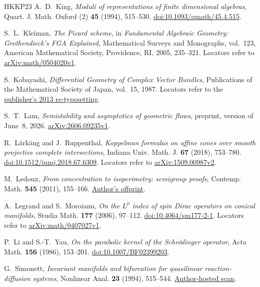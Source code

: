 \begin{thebibliography}{HKKP23}
A.~D.~King, \emph{Moduli of representations of finite dimensional algebras},
Quart. J. Math. Oxford (2) \textbf{45} (1994), 515--530.
\href{https://doi.org/10.1093/qmath/45.4.515}{doi:10.1093/qmath/45.4.515}.

S.~L.~Kleiman, \emph{The Picard scheme}, in
\emph{Fundamental Algebraic Geometry: Grothendieck's FGA Explained},
Mathematical Surveys and Monographs, vol.~123,
American Mathematical Society, Providence, RI, 2005, 235--321.
Locators refer to \href{https://arxiv.org/abs/math/0504020v1}{arXiv:math/0504020v1}.

S.~Kobayashi, \emph{Differential Geometry of Complex Vector Bundles},
Publications of the Mathematical Society of Japan, vol.~15, 1987.
Locators refer to the
\href{https://www.mathsoc.jp/assets/pdf/publications/pubmsj/Vol15.pdf}
{publisher's 2013 re-typesetting}.

S.~T.~Lam, \emph{Semistability and asymptotics of geometric flows},
preprint, version of June~8, 2026.
\href{https://arxiv.org/abs/2606.09235v1}{arXiv:2606.09235v1}.

R.~Lärkäng and J.~Ruppenthal,
\emph{Koppelman formulas on affine cones over smooth projective
complete intersections}, Indiana Univ. Math. J. \textbf{67} (2018), 753--780.
\href{https://doi.org/10.1512/iumj.2018.67.6309}{doi:10.1512/iumj.2018.67.6309}.
Locators refer to \href{https://arxiv.org/abs/1509.00987v2}{arXiv:1509.00987v2}.

M.~Ledoux, \emph{From concentration to isoperimetry: semigroup proofs},
Contemp. Math. \textbf{545} (2011), 155--166.
\href{https://www.math.univ-toulouse.fr/~ledoux/conciso.pdf}
{Author's offprint}.

A.~Legrand and S.~Moroianu,
\emph{On the $L^p$ index of spin Dirac operators on conical manifolds},
Studia Math. \textbf{177} (2006), 97--112.
\href{https://doi.org/10.4064/sm177-2-1}{doi:10.4064/sm177-2-1}.
Locators refer to \href{https://arxiv.org/abs/math/0407027v1}{arXiv:math/0407027v1}.

P.~Li and S.-T.~Yau,
\emph{On the parabolic kernel of the Schrödinger operator},
Acta Math. \textbf{156} (1986), 153--201.
\href{https://doi.org/10.1007/BF02399203}{doi:10.1007/BF02399203}.

G.~Simonett, \emph{Invariant manifolds and bifurcation for quasilinear
reaction-diffusion systems}, Nonlinear Anal. \textbf{23} (1994), 515--544.
\href{https://math.vanderbilt.edu/simoneg/preprints/Bifurcation.pdf}
{Author-hosted scan}.


\end{thebibliography}
